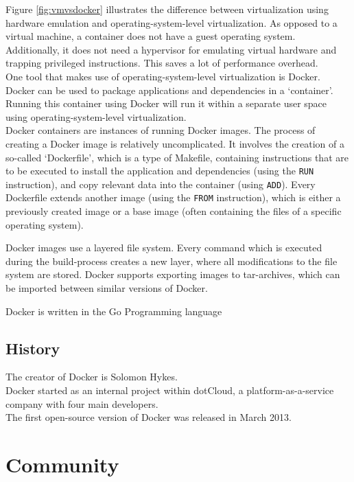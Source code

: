 Figure \ref{fig:vmvsdocker} illustrates the difference between virtualization using hardware emulation and operating-system-level virtualization. As opposed to a virtual machine, a container does not have a guest operating system. Additionally, it does not need a hypervisor for emulating virtual hardware and trapping privileged instructions. This saves a lot of performance overhead. \\

One tool that makes use of operating-system-level virtualization is Docker. Docker can be used to package applications and dependencies in a `container'. Running this container using Docker will run it within a separate user space using operating-system-level virtualization. \\
Docker containers are instances of running Docker images. The process of creating a Docker image is relatively uncomplicated. It involves the creation of a so-called `Dockerfile', which is a type of Makefile, containing instructions that are to be executed to install the application and dependencies (using the \verb|RUN| instruction), and copy relevant data into the container (using \verb|ADD|). Every Dockerfile extends another image (using the \verb|FROM| instruction), which is either a previously created image or a base image (often containing the files of a specific operating system).

Docker images use a layered file system. Every command which is executed during the
build-process creates a new layer, where all modifications to the file system are stored.
Docker supports exporting images to tar-archives, which can be imported between similar versions of Docker.

 Docker is written in the Go Programming language \\
\subsection{History}
The creator of Docker is Solomon Hykes. \\
Docker started as an internal project within dotCloud, a platform-as-a-service company with four main developers. \\
The first open-source version of Docker was released in March 2013.\\

\section{Community}


